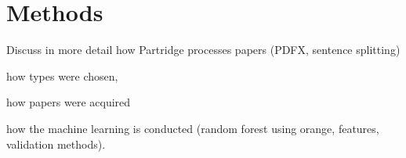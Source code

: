 \documentclass{svmult}
\begin{document}


\section{Methods}
\label{sec:2}

Discuss in more detail how Partridge processes papers (PDFX, sentence splitting) 

how types were chosen,

how papers were acquired 

how the machine learning is conducted (random forest using orange, features, validation methods).



%
%

\end{document}
